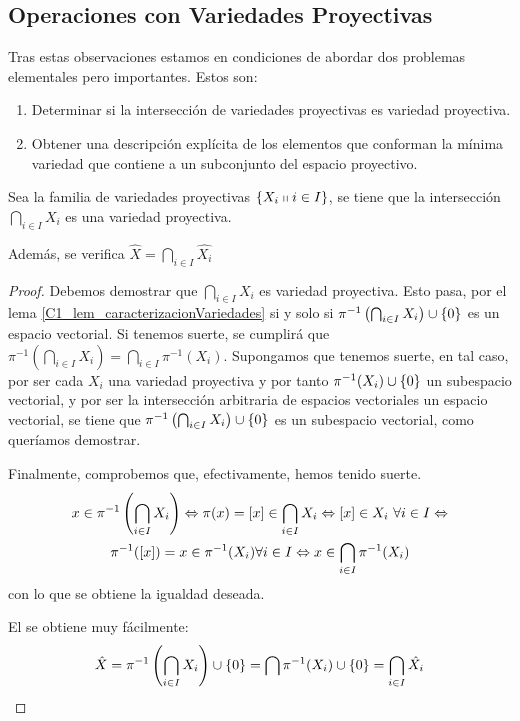 \subsection{Operaciones con Variedades Proyectivas}
Tras estas observaciones estamos en condiciones de abordar dos problemas elementales pero importantes. Estos son:
\begin{enumerate}
	\item Determinar si la intersección de variedades proyectivas es variedad proyectiva.
	\item Obtener una descripción explícita de los elementos que conforman la mínima variedad que contiene a un subconjunto del espacio proyectivo.
\end{enumerate}
\begin{lem}
	\label{C1_lem_interseccionVariedades}
	Sea la familia de variedades proyectivas $\{X_i\shortparallel i\in I\}$, se tiene que la intersección $\bigcap_{i\in I}X_i$ es una variedad proyectiva.
	
	Además, se verifica $\hat{X}=\bigcap_{i\in I}\hat{X_i}$
\end{lem}
\begin{proof}
	Debemos demostrar que $\bigcap_{i\in I}X_i$ es variedad proyectiva. Esto pasa, por el lema \ref{C1_lem_caracterizacionVariedades} si y solo si $\pi^{-1}\left(\bigcap_{i\in I}X_i\right)\cup\{0\}$ es un espacio vectorial. Si tenemos suerte, se cumplirá que $\pi^{-1}\left(\bigcap_{i\in I}X_i\right)=\bigcap_{i\in I}\pi^{-1}(X_i)$. Supongamos que tenemos suerte, en tal caso, por ser cada $X_i$ una variedad proyectiva y por tanto $\pi^{-1}(X_i)\cup\{0\}$ un subespacio vectorial, y por ser la intersección arbitraria de espacios vectoriales un espacio vectorial, se tiene que $\pi^{-1}\left(\bigcap_{i\in I}X_i\right)\cup\{0\}$ es un subespacio vectorial, como queríamos demostrar.
	
	Finalmente, comprobemos que, efectivamente, hemos tenido suerte.
	\begin{multline*}
		x\in\pi^{-1}\left(\bigcap_{i\in I}X_i\right)\Leftrightarrow \pi(x)=\left [ x \right ]\in\bigcap_{i\in I}X_i\Leftrightarrow\left [ x \right ]\in X_i\ \forall i\in I\Leftrightarrow\\\pi^{-1}(\left [ x \right ])=x\in\pi^{-1}(X_i)\forall i\in I\Leftrightarrow x\in\bigcap_{i\in I}\pi^{-1}(X_i)
	\end{multline*}
	con lo que se obtiene la igualdad deseada.
	
	El  se obtiene muy fácilmente:\[\hat{X}=\pi^{-1}\left(\bigcap_{i\in I}X_i\right)\cup\{0\}=\bigcap\pi^{-1}(X_i)\cup\{0\}=\bigcap_{i\in I}\hat{X_i}\]
\end{proof}
